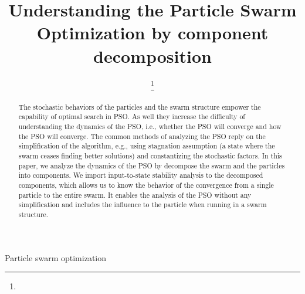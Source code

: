 \documentclass[journal]{IEEEtran}
\begin{document}
\title{Understanding the Particle Swarm Optimization by component decomposition}

\author{

\thanks{}
}

\markboth{}{}

\maketitle

\begin{abstract}
The stochastic behaviors of the particles and the swarm structure empower the capability of optimal search in PSO.
As well they increase the difficulty of understanding the dynamics of the PSO, i.e., whether the PSO will converge and how the PSO will converge.
The common methods of analyzing the PSO reply on the simplification of the algorithm, e.g., using stagnation assumption (a state where the swarm ceases finding better solutions) and constantizing the stochastic factors.
In this paper, we analyze the dynamics of the PSO by decompose the swarm and the particles into components.
We import input-to-state stability analysis to the decomposed components, which allows us to know the behavior of the convergence from a single particle to the entire swarm.
It enables the analysis of the PSO without any simplification and includes the influence to the particle when running in a swarm structure.


\end{abstract}

\begin{IEEEkeywords}
Particle swarm optimization
\end{IEEEkeywords}

\IEEEpeerreviewmaketitle



















\end{document}

